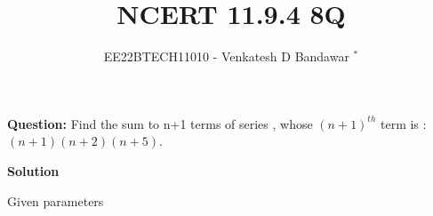\documentclass[journal,12pt,twocolumn]{IEEEtran}
\theoremstyle{remark}
\begin{document}

\vspace{3cm}

\title{NCERT 11.9.4 8Q}
\author{EE22BTECH11010 - Venkatesh D Bandawar $^{*}$%
}
\maketitle
\bigskip

\renewcommand{\thefigure}{\theenumi}
\renewcommand{\thetable}{\theenumi}

\textbf{Question:} Find the sum to n+1 terms of series , whose $(n+1)^{th}$ term is : $(n+1)(n+2)(n+5)$.

\textbf{Solution}
\begin{table}[!h] 
\centering

\caption{Given parameters}
\label{given parameters list}
\end{table}
\end{document}
